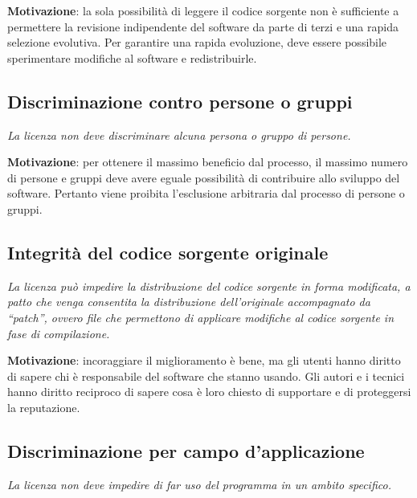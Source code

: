 \textbf{Motivazione}: la sola possibilità di leggere il codice sorgente non è sufficiente a permettere la revisione indipendente del software da parte di terzi e una rapida selezione evolutiva. Per garantire una rapida evoluzione, deve essere possibile sperimentare modifiche al software e redistribuirle.

\subsection{Discriminazione contro persone o gruppi}

\begin{center}

\textit{La licenza non deve discriminare alcuna persona o gruppo di persone.}

\end{center}

\textbf{Motivazione}: per ottenere il massimo beneficio dal processo, il massimo numero di persone e gruppi deve avere eguale possibilità di contribuire allo sviluppo del software. Pertanto viene proibita l'esclusione arbitraria dal processo di persone o gruppi.

\subsection{Integrità del codice sorgente originale}

\begin{center}

\textit{La licenza può impedire la distribuzione del codice sorgente in forma modificata, a patto che venga consentita la distribuzione dell'originale accompagnato da ``patch'', ovvero file che permettono di applicare modifiche al codice sorgente in fase di compilazione.}

\end{center}

\textbf{Motivazione}: incoraggiare il miglioramento è bene, ma gli utenti hanno diritto di sapere chi è responsabile del software che stanno usando. Gli autori e i tecnici hanno diritto reciproco di sapere cosa è loro chiesto di supportare e di proteggersi la reputazione.

\subsection{Discriminazione per campo d'applicazione}

\begin{center}

\textit{La licenza non deve impedire di far uso del programma in un ambito specifico.}

\end{center}

